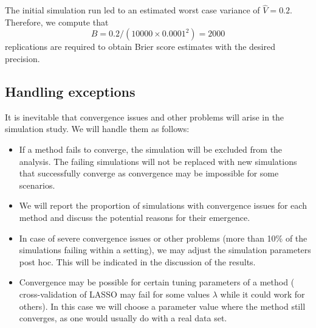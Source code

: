 The initial simulation run led to an estimated worst case variance of
$\widehat{V} = 0.2$. Therefore, we compute that
$$B = 0.2/(10000 \times 0.0001^{2}) = 2000$$
replications are required to obtain Brier score estimates with the
desired precision.

\subsection{Handling exceptions} \label{sec:exceptions}
It is inevitable that convergence issues and other problems will arise in the
simulation study. We will handle them as follows:
\begin{itemize}
  \item If a method fails to converge, the simulation will be excluded from the
        analysis. The failing simulations will not be replaced with new
        simulations that successfully converge as convergence may be impossible
        for some scenarios.
  \item We will report the proportion of simulations with convergence issues for
        each method and discuss the potential reasons for their emergence.
  \item In case of severe convergence issues or other problems (more than 10\%
        of the simulations failing within a setting), we may adjust the
        simulation parameters post hoc. This will be indicated in the discussion
        of the results.
  \item Convergence may be possible for certain tuning parameters of a method
        (\eg{} cross-validation of LASSO may fail for some values $\lambda$
        while it could work for others). In this case we will choose a parameter
        value where the method still converges, as one would usually do with a
        real data set.
\end{itemize}
